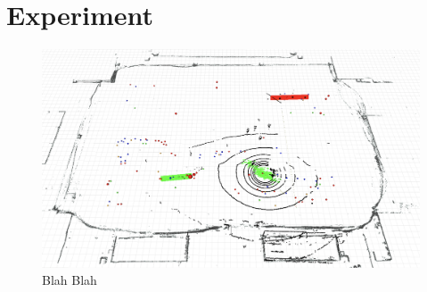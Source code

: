 \section{Experiment}

\begin{figure}[H]
	\centering
	\includegraphics[scale=0.33]{fig/experiment}
	\caption[Experiment results]{Blah Blah}
	\label{fig:range}
\end{figure}


\newpage